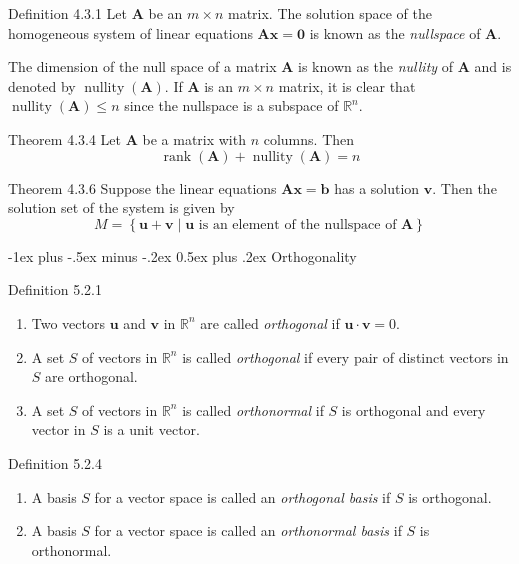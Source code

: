 \documentclass[10pt,landscape]{article}
\makeatletter
\renewcommand{\section}{\@startsection{section}{1}{0mm}%
                                {-1ex plus -.5ex minus -.2ex}%
                                {0.5ex plus .2ex}%
                                {\normalfont\large\bfseries}}
\newcommand{\matr}[1]{\bm{#1}}
\newcommand{\vect}[1]{\bm{#1}}
\newcommand{\rank}{\operatorname{rank}}
\newcommand{\nullity}{\operatorname{nullity}}
\theoremstyle{definition}
\newcommand{\thistheoremname}{}
\newtheorem*{genericthm*}{\thistheoremname}
\newenvironment{namedthm*}[1]
{\renewcommand{\thistheoremname}{#1}\begin{genericthm*}}
{\end{genericthm*}}
\makeatother
\begin{document}
\begin{multicols}{3}
\begin{namedthm*}{Definition 4.3.1}
    Let \(\matr{A}\) be an \(m \times n\) matrix. The solution space of the homogeneous system of linear equations \(\matr{A}\vect{x} = \vect{0}\) is known as the \textit{nullspace} of \(\matr{A}\).
    
    \medskip
    \noindent
    The dimension of the null space of a matrix \(\matr{A}\) is known as the \textit{nullity} of \(\matr{A}\) and is denoted by \(\nullity(\matr{A})\). If \(\matr{A}\) is an \(m \times n\) matrix, it is clear that \(\nullity(\matr{A}) \le n\) since the nullspace is a subspace of \(\mathbb{R}^n\).
\end{namedthm*}

\begin{namedthm*}{Theorem 4.3.4}
    Let \(\matr{A}\) be a matrix with \(n\) columns. Then
    \[
        \rank(\matr{A}) + \nullity(\matr{A}) = n
    \]
\end{namedthm*}

\begin{namedthm*}{Theorem 4.3.6}
    Suppose the linear equations \(\matr{A}\vect{x} = \vect{b}\) has a solution \(\vect{v}\). Then the solution set of the system is given by
    \[
        M = \left\{\vect{u} + \vect{v} \mid \vect{u} \text{ is an element of the nullspace of \(\matr{A}\)}\right\}
    \]
\end{namedthm*}

\section{Orthogonality}

\begin{namedthm*}{Definition 5.2.1}
    ~
    \begin{enumerate}
        \item Two vectors \(\vect{u}\) and \(\vect{v}\) in \(\mathbb{R}^n\) are called \textit{orthogonal} if \(\vect{u}\cdot\vect{v} = 0\).
        \item A set \(S\) of vectors in \(\mathbb{R}^n\) is called \textit{orthogonal} if every pair of distinct vectors in \(S\) are orthogonal.
        \item A set \(S\) of vectors in \(\mathbb{R}^n\) is called \textit{orthonormal} if \(S\) is orthogonal and every vector in \(S\) is a unit vector.
    \end{enumerate}
\end{namedthm*}

\begin{namedthm*}{Definition 5.2.4}
    ~
    \begin{enumerate}
        \item A basis \(S\) for a vector space is called an \textit{orthogonal basis} if \(S\) is orthogonal.
        \item A basis \(S\) for a vector space is called an \textit{orthonormal basis} if \(S\) is orthonormal.
    \end{enumerate}
\end{namedthm*}


\end{multicols}
\end{document}
